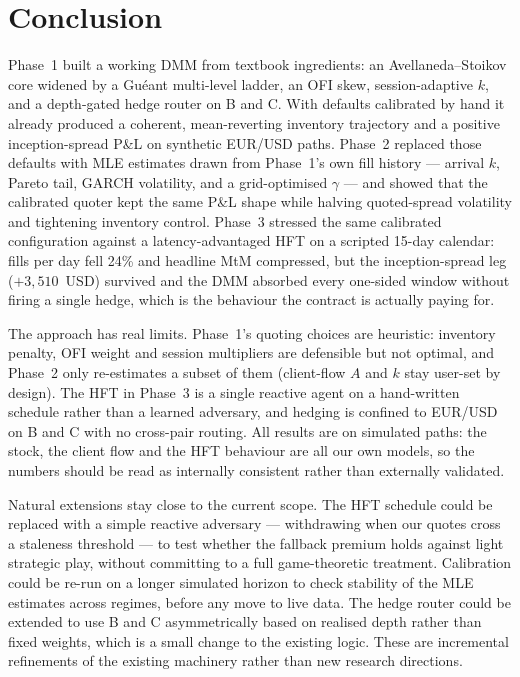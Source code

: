 \section{Conclusion}
\label{sec:conclusion}

Phase~1 built a working DMM from textbook ingredients: an
Avellaneda--Stoikov core widened by a Guéant multi-level ladder, an
OFI skew, session-adaptive $k$, and a depth-gated hedge router on
B and C. With defaults calibrated by hand it already produced a
coherent, mean-reverting inventory trajectory and a positive
inception-spread P\&L on synthetic EUR/USD paths. Phase~2 replaced
those defaults with MLE estimates drawn from Phase~1's own fill
history --- arrival $k$, Pareto tail, GARCH volatility, and a
grid-optimised $\gamma$ --- and showed that the calibrated quoter
kept the same P\&L shape while halving quoted-spread volatility and
tightening inventory control. Phase~3 stressed the same calibrated
configuration against a latency-advantaged HFT on a scripted 15-day
calendar: fills per day fell 24\% and headline MtM compressed, but
the inception-spread leg ($+3{,}510$~USD) survived and the DMM
absorbed every one-sided window without firing a single hedge,
which is the behaviour the contract is actually paying for.

The approach has real limits. Phase~1's quoting choices are
heuristic: inventory penalty, OFI weight and session multipliers
are defensible but not optimal, and Phase~2 only re-estimates a
subset of them (client-flow $A$ and $k$ stay user-set by design).
The HFT in Phase~3 is a single reactive agent on a hand-written
schedule rather than a learned adversary, and hedging is confined
to EUR/USD on B and C with no cross-pair routing. All results are
on simulated paths: the stock, the client flow and the HFT
behaviour are all our own models, so the numbers should be read as
internally consistent rather than externally validated.

Natural extensions stay close to the current scope. The HFT schedule could be replaced with a simple reactive adversary — withdrawing when our quotes cross a staleness threshold — to test whether the fallback premium holds against light strategic play, without committing to a full game-theoretic treatment. Calibration could be re-run on a longer simulated horizon to check stability of the MLE estimates across regimes, before any move to live data. The hedge router could be extended to use B and C asymmetrically based on realised depth rather than fixed weights, which is a small change to the existing logic. These are incremental refinements of the existing machinery rather than new research directions.
